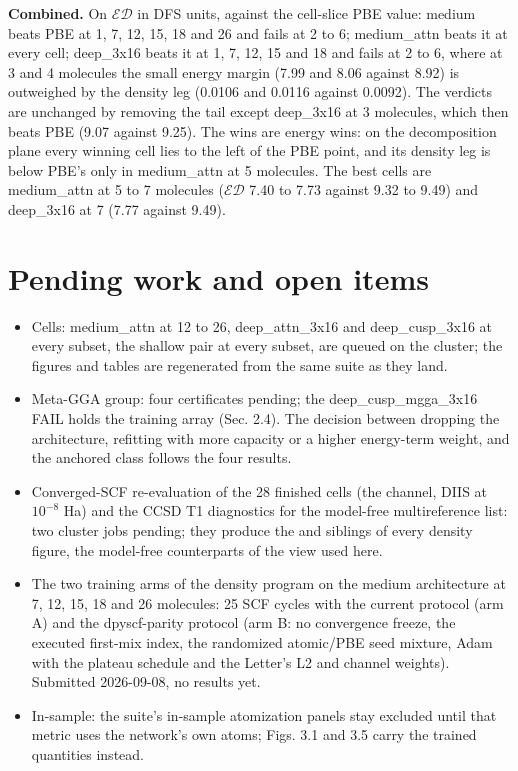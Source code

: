 \documentclass[10pt,a4paper]{article}
\begin{document}
\textbf{Combined.} On $\mathcal{ED}$ in DFS units, against the cell-slice PBE value: medium beats
PBE at 1, 7, 12, 15, 18 and 26 and fails at 2 to 6; medium\_attn beats it at every cell;
deep\_3x16 beats it at 1, 7, 12, 15 and 18 and fails at 2 to 6, where at 3 and 4 molecules the
small energy margin (7.99 and 8.06 against 8.92) is outweighed by the density leg (0.0106 and
0.0116 against 0.0092).
The verdicts are unchanged by removing the tail except deep\_3x16 at 3 molecules, which then
beats PBE (9.07 against 9.25). The wins are energy wins: on the decomposition plane every
winning cell lies to the left of the PBE point, and its density leg is below PBE's only in
medium\_attn at 5 molecules. The best cells are medium\_attn at 5 to 7 molecules ($\mathcal{ED}$ 7.40
to 7.73 against 9.32 to 9.49) and deep\_3x16 at 7 (7.77 against 9.49).


\section{Pending work and open items}

\begin{itemize}
\item Cells: medium\_attn at 12 to 26, deep\_attn\_3x16 and deep\_cusp\_3x16 at every subset, the shallow pair at every subset, are queued on the cluster; the figures and tables are regenerated from the same suite as they land.
\item Meta-GGA group: four certificates pending; the deep\_cusp\_mgga\_3x16 FAIL holds the training array (Sec. 2.4). The decision between dropping the architecture, refitting with more capacity or a higher energy-term weight, and the anchored class follows the four results.
\item Converged-SCF re-evaluation of the 28 finished cells (the  channel, DIIS at $10^{-8}$ Ha) and the CCSD T1 diagnostics for the model-free multireference list: two cluster jobs pending; they produce the  and  siblings of every density figure, the model-free counterparts of the  view used here.
\item The two training arms of the density program on the medium architecture at 7, 12, 15, 18 and 26 molecules: 25 SCF cycles with the current protocol (arm A) and the dpyscf-parity protocol (arm B: no convergence freeze, the executed first-mix index, the randomized atomic/PBE seed mixture, Adam with the plateau schedule and the Letter's L2 and channel weights). Submitted 2026-09-08, no results yet.
\item In-sample: the suite's in-sample atomization panels stay excluded until that metric uses the network's own atoms; Figs. 3.1 and 3.5 carry the trained quantities instead.
\end{itemize}
\end{document}
